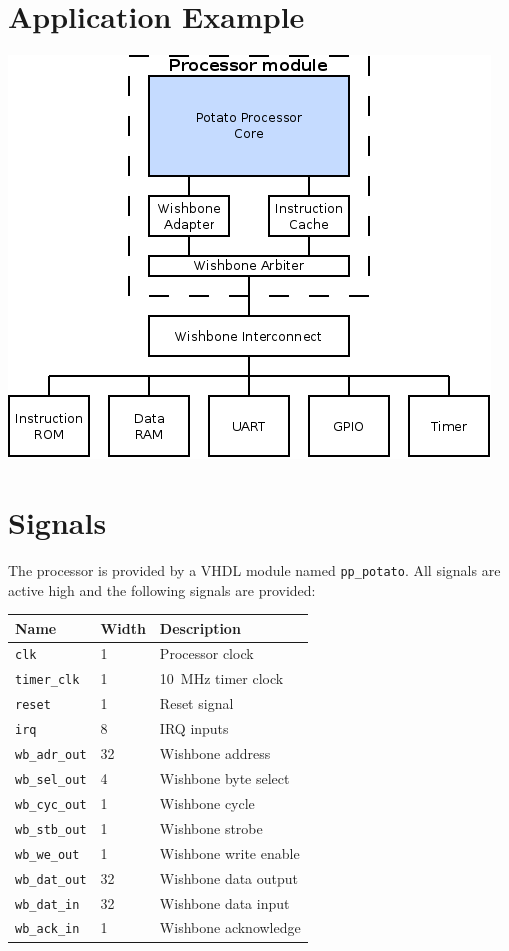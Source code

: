 \documentclass[10pt,a4paper]{article}
\begin{document}
\begin{minipage}[t]{0.48\textwidth}

\section{Application Example}
\includegraphics[width=\textwidth]{example.png}

\section{Signals}

The processor is provided by a VHDL module named \texttt{pp\_potato}. All signals
are active high and the following signals are provided:\\

\begin{tabularx}{\textwidth}{|l|l|X|}
\hline
\textbf{Name} & \textbf{Width} & \textbf{Description} \\
\hline
\texttt{clk} & 1 & Processor clock \\
\texttt{timer\_clk} & 1 & 10~MHz timer clock \\
\texttt{reset} & 1 & Reset signal \\
\hline
\texttt{irq} & 8 & IRQ inputs \\
\hline
\texttt{wb\_adr\_out} & 32 & Wishbone address \\
\texttt{wb\_sel\_out} & 4 & Wishbone byte select \\
\texttt{wb\_cyc\_out} & 1 & Wishbone cycle \\
\texttt{wb\_stb\_out} & 1 & Wishbone strobe \\
\texttt{wb\_we\_out} & 1 & Wishbone write enable \\
\texttt{wb\_dat\_out} & 32 & Wishbone data output \\
\texttt{wb\_dat\_in} & 32 & Wishbone data input \\
\texttt{wb\_ack\_in} & 1 & Wishbone acknowledge \\
\hline
\end{tabularx}\\


\end{minipage}
\end{document}
